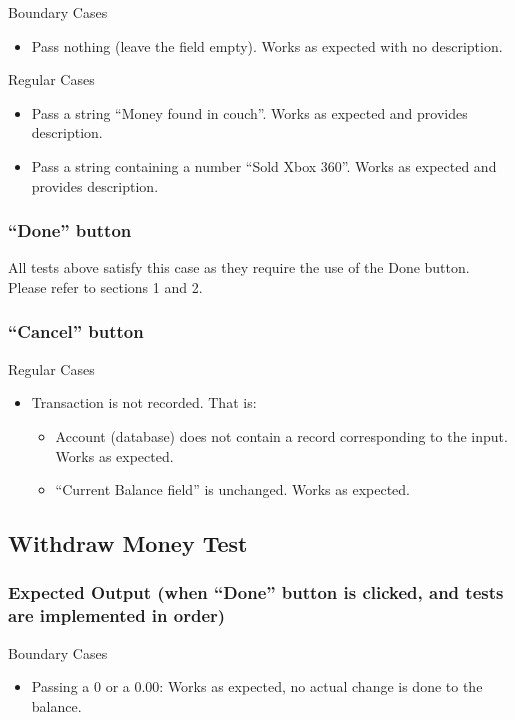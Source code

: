 \documentclass[12pt]{article}
\begin{document}
Boundary Cases
\begin{itemize}
  \item Pass nothing (leave the field empty). Works as expected with no description.
\end{itemize}

Regular Cases
\begin{itemize}
  \item Pass a string ``Money found in couch''. Works as expected and provides description.
  \item Pass a string containing a number ``Sold Xbox 360''. Works as expected and provides description.
\end{itemize}

\subsubsection{``Done'' button}

All tests above satisfy this case as they require the use of the Done button. Please refer to sections 1 and 2.
	
\subsubsection{``Cancel'' button}

Regular Cases
\begin{itemize}
  \item Transaction is not recorded. That is:
  \begin{itemize}
    \item Account (database) does not contain a record corresponding to the input. Works as expected.
    \item ``Current Balance field'' is unchanged. Works as expected.
  \end{itemize}
\end{itemize}

\subsection{Withdraw Money Test}

\subsubsection{Expected Output (when ``Done'' button is clicked, and tests are implemented in order)}

Boundary Cases
\begin{itemize}
  \item Passing a 0 or a 0.00: Works as expected, no actual change is done to the balance.
\end{itemize}
\end{document}
